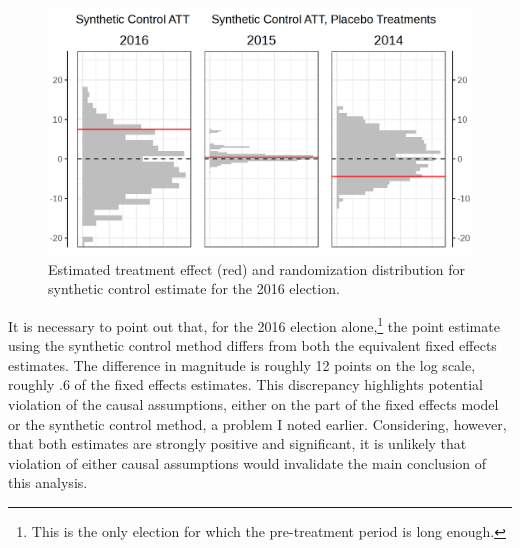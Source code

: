 \documentclass[12pt]{article}\usepackage[]{graphicx}\usepackage[]{color}
\newcommand{\1}{\mathbbm{1}}
\begin{document}
\begin{figure}[!htbp]
	\centering
	\includegraphics[width=\textwidth]{figure/SYP_Synth.png}
	\captionsetup{singlelinecheck=off}
	\caption[Estimated treatment effects for Synthetic Control]{Estimated treatment effect (red) and randomization distribution for synthetic control estimate for the 2016 election.}
	\label{fig:Synth}
\end{figure}

It is necessary to point out that, for the 2016 election alone,\footnote{This is the only election for which the pre-treatment period is long enough.} the point estimate using the synthetic control method differs from both the equivalent fixed effects estimates. The difference in magnitude is roughly 12 points on the log scale, roughly .6 of the fixed effects estimates. This discrepancy highlights potential violation of the causal assumptions, either on the part of the fixed effects model or the synthetic control method, a problem I noted earlier. Considering, however, that both estimates are strongly positive and significant, it is unlikely that violation of either causal assumptions would invalidate the main conclusion of this analysis.
\end{document}
